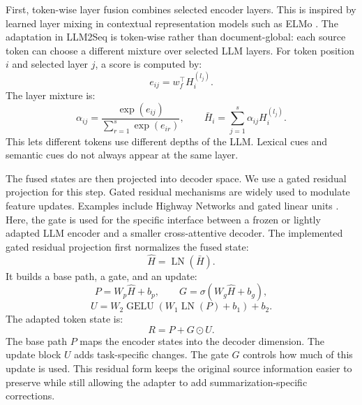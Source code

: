 \documentclass[11pt]{article}
\begin{document}
First, token-wise layer fusion combines selected encoder layers.
This is inspired by learned layer mixing in contextual representation models such as ELMo \citep{peters2018elmo}.
The adaptation in LLM2Seq is token-wise rather than document-global: each source token can choose a different mixture over selected LLM layers.
For token position $i$ and selected layer $j$, a score is computed by:
\begin{equation}
e_{ij}=w_f^\top H^{(l_j)}_i.
\end{equation}
The layer mixture is:
\begin{equation}
\alpha_{ij}
=\frac{\exp(e_{ij})}{\sum_{r=1}^{s}\exp(e_{ir})},
\qquad
\bar{H}_i=\sum_{j=1}^{s}\alpha_{ij}H^{(l_j)}_i.
\end{equation}
This lets different tokens use different depths of the LLM.
Lexical cues and semantic cues do not always appear at the same layer.

The fused states are then projected into decoder space.
We use a gated residual projection for this step.
Gated residual mechanisms are widely used to modulate feature updates.
Examples include Highway Networks and gated linear units \citep{srivastava2015highway,dauphin2017glu}.
Here, the gate is used for the specific interface between a frozen or lightly adapted LLM encoder and a smaller cross-attentive decoder.
The implemented gated residual projection first normalizes the fused state:
\begin{equation}
\hat{H}=\operatorname{LN}(\bar{H}).
\end{equation}
It builds a base path, a gate, and an update:
\begin{equation}
P=W_p\hat{H}+b_p,
\qquad
G=\sigma(W_g\hat{H}+b_g),
\end{equation}
\begin{equation}
U=W_2\operatorname{GELU}(W_1\operatorname{LN}(P)+b_1)+b_2.
\end{equation}
The adapted token state is:
\begin{equation}
R=P+G\odot U.
\end{equation}
The base path $P$ maps the encoder states into the decoder dimension.
The update block $U$ adds task-specific changes.
The gate $G$ controls how much of this update is used.
This residual form keeps the original source information easier to preserve while still allowing the adapter to add summarization-specific corrections.
\end{document}
